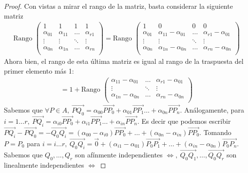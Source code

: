 \documentclass[14pt]{book}
\begin{document}
\begin{proof}
	Con vistas a mirar el rango de la matriz, basta considerar la siguiente matriz
	\begin{align*}
		\text{Rango }\left(\begin{array}{cccc}
		1 & 1 & 1 & 1 \\
		\alpha_{01} & \alpha_{11} & \dots & \alpha_{r1} \\
		\vdots & \vdots & \ddots & \vdots \\
		\alpha_{0n} & \alpha_{1n} & \dots & \alpha_{rn} \\
		\end{array}
		\right) =
		\text{Rango }\left(\begin{array}{cccc}
		1 & 0 & 0 & 0 \\
		\alpha_{01} & \alpha_{11} - \alpha_{01} & \dots & \alpha_{r1} - \alpha_{01} \\
		\vdots & \vdots & \ddots & \vdots \\
		\alpha_{0n} & \alpha_{1n} - \alpha_{0n} & \dots & \alpha_{rn} - \alpha_{0n} \\
		\end{array}
		\right)
	\end{align*}
	Ahora bien, el rango de esta última matriz es igual al rango de la traspuesta del primer elemento más 1:
	\begin{align*}
		= 1 + \text{Rango }\left(\begin{array}{ccc}
		\alpha_{11} - \alpha_{01} & \dots & \alpha_{r1} - \alpha_{01} \\
		\vdots & \ddots & \vdots \\
		\alpha_{1n} - \alpha_{0n} & \dots & \alpha_{rn} - \alpha_{0n} \\
		\end{array}
		\right)
	\end{align*}
	Sabemos que $\forall P \in A,\ \overrightarrow{P Q_0} = \alpha_{00} \overrightarrow{P P_0} + \alpha_{01}\overrightarrow{P P_1} \dots + \alpha_{0n} \overrightarrow{P P_n}$. Análogamente, para $i = 1 \dots r,\ \overrightarrow{P Q_i} = \alpha_{i0} \overrightarrow{P P_0} + \alpha_{i1}\overrightarrow{P P_1} \dots + \alpha_{in} \overrightarrow{P P_n}$. Es decir que podemos escribir $\overrightarrow{P Q_i} - \overrightarrow{P Q_0} = -\overrightarrow{Q_0 Q_i} = (\alpha_{00} - \alpha_{i0})\overrightarrow{P P_0} + \dots + (\alpha_{0n} - \alpha_{in})\overrightarrow{P P_0}$. Tomando $P = P_0$ para $i = i \dots r,\ \overrightarrow{Q_0 Q_i} =  \overrightarrow{0} + (\alpha_{i1} - \alpha_{01})\overrightarrow{P_0 P_1} +  \dots + (\alpha_{in} - \alpha_{0n})\overrightarrow{P_0 P_n}$. Sabemos que $Q_0, \dots, Q_r$ son afínmente independientes $\iff,\ \overrightarrow{Q_0 Q_1}, \dots, \overrightarrow{Q_0 Q_r}$ son linealmente independientes $\iff$

\end{proof}
\end{document}
